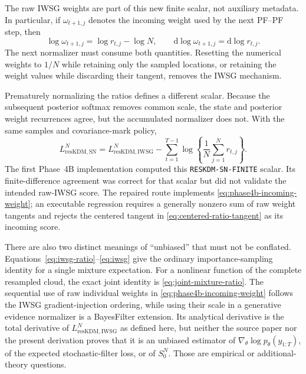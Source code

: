 \documentclass[11pt]{article}
\newcommand{\dd}{\mathrm{d}}
\begin{document}
The raw IWSG weights are part of this new finite scalar, not auxiliary
metadata.  In particular, if $\omega_{t+1,j}$ denotes the incoming weight used
by the next PF--PF step, then
\begin{equation}
 \log\omega_{t+1,j}=\log r_{t,j}-\log N,\qquad
 \dd\log\omega_{t+1,j}=\dd\log r_{t,j}.
 \label{eq:phase4b-incoming-weight}
\end{equation}
The next normalizer must consume both quantities.  Resetting the numerical
weights to $1/N$ while retaining only the sampled locations, or retaining the
weight values while discarding their tangent, removes the IWSG mechanism.

Prematurely normalizing the ratios defines a different scalar.  Because the
subsequent posterior softmax removes common scale, the state and posterior
weight recurrences agree, but the accumulated normalizer does not.  With the
same samples and covariance-mark policy,
\begin{equation}
 L_{\mathrm{resKDM,SN}}^N
 =L_{\mathrm{resKDM,IWSG}}^N
  -\sum_{t=1}^{T-1}\log\left\{\frac1N\sum_{j=1}^N r_{t,j}\right\}.
 \label{eq:phase4b-self-normalized-difference}
\end{equation}
The first Phase~4B implementation computed this
\texttt{RESKDM-SN-FINITE} scalar.  Its finite-difference agreement was correct
for that scalar but did not validate the intended raw-IWSG score.  The repaired
route implements \eqref{eq:phase4b-incoming-weight}; an executable regression
requires a generally nonzero sum of raw weight tangents and rejects the
centered tangent in \eqref{eq:centered-ratio-tangent} as its incoming score.

There are also two distinct meanings of ``unbiased'' that must not be
conflated.  Equations~\eqref{eq:iwsg-ratio}--\eqref{eq:iwsg} give the ordinary
importance-sampling identity for a single mixture expectation.  For a
nonlinear function of the complete resampled cloud, the exact joint identity
is \eqref{eq:joint-mixture-ratio}.  The sequential use of raw individual
weights in \eqref{eq:phase4b-incoming-weight} follows the IWSG
gradient-injection ordering, while using their scale in a generative evidence
normalizer is a BayesFilter extension.  Its analytical derivative is the total
derivative of $L_{\mathrm{resKDM,IWSG}}^N$ as defined here, but neither the
source paper nor the present derivation proves that it is an unbiased estimator of
$\nabla_\theta\log p_\theta(y_{1:T})$, of the expected stochastic-filter loss,
or of $S_0^N$.  Those are empirical or additional-theory questions.
\end{document}
